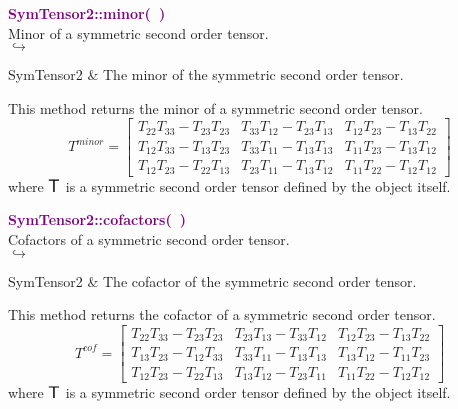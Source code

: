 \textcolor{purple}{\textbf{SymTensor2::minor(~)}}\label{SymTensor2::minor()}\\
Minor of a symmetric second order tensor.\\ \hspace*{5mm}$\hookrightarrow$
\vspace*{-2em}\begin{tcolorbox}[grow to left by=-1cm, width=\textwidth-1cm,myArgs,tabularx={l|R}]
SymTensor2 & The minor of the symmetric second order tensor.
\end{tcolorbox}

This method returns the minor of a symmetric second order tensor.
\begin{equation*}
T^{minor} = \left[\begin{array}{ccc}
T_{22}T_{33}-T_{23}T_{23} & T_{33}T_{12}-T_{23}T_{13} & T_{12}T_{23}-T_{13}T_{22}\\
T_{12}T_{33}-T_{13}T_{23} & T_{33}T_{11}-T_{13}T_{13} & T_{11}T_{23}-T_{13}T_{12}\\
T_{12}T_{23}-T_{22}T_{13} & T_{23}T_{11}-T_{13}T_{12} & T_{11}T_{22}-T_{12}T_{12}
\end{array}
\right]
\end{equation*}
where $\mbox{\large\ensuremath{\mathsf{T}}}$ is a symmetric second order tensor defined by the object itself.

\textcolor{purple}{\textbf{SymTensor2::cofactors(~)}}\label{SymTensor2::cofactors()}\\
Cofactors of a symmetric second order tensor.\\ \hspace*{5mm}$\hookrightarrow$
\vspace*{-2em}\begin{tcolorbox}[grow to left by=-1cm, width=\textwidth-1cm,myArgs,tabularx={l|R}]
SymTensor2 & The cofactor of the symmetric second order tensor.
\end{tcolorbox}

This method returns the cofactor of a symmetric second order tensor.
\begin{equation*}
T^{cof} = \left[\begin{array}{ccc}
T_{22}T_{33}-T_{23}T_{23} & T_{23}T_{13}-T_{33}T_{12} & T_{12}T_{23}-T_{13}T_{22}\\
T_{13}T_{23}-T_{12}T_{33} & T_{33}T_{11}-T_{13}T_{13} & T_{13}T_{12}-T_{11}T_{23}\\
T_{12}T_{23}-T_{22}T_{13} & T_{13}T_{12}-T_{23}T_{11} & T_{11}T_{22}-T_{12}T_{12}
\end{array}
\right]
\end{equation*}
where $\mbox{\large\ensuremath{\mathsf{T}}}$ is a symmetric second order tensor defined by the object itself.

